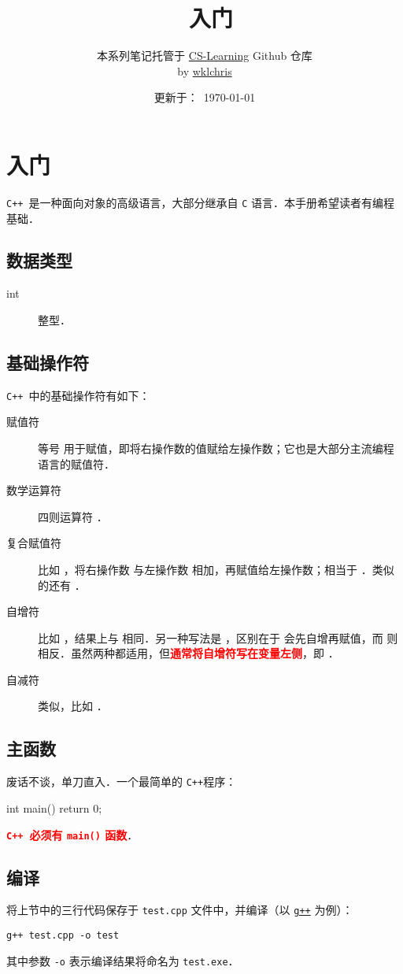 \documentclass[a4paper, zihao=-4, linespread=1]{ctexrep}
\title{\cpp\ 入门}
\author{
  本系列笔记托管于 \href{https://github.com/wklchris/CS-Learning}{CS-Learning} Github 仓库\\
  by \href{email:wklchris@hotmail.com}{wklchris}
}
\date{更新于：~\today}
\newcommand\cpp{\texttt{C++}}
\newcommand\hlt[1]{\textcolor{red}{\bfseries #1}}
\begin{document}
\maketitle

\chapter{入门}
\cpp\ 是一种面向对象的高级语言，大部分继承自 \texttt{C} 语言．本手册希望读者有编程基础．

\section{数据类型}
\begin{description}
\item[int] 整型．
\end{description}

\section{基础操作符}
\cpp\ 中的基础操作符有如下：
\begin{description}
\item[赋值符] 等号 \cppline{=} 用于赋值，即将右操作数的值赋给左操作数；它也是大部分主流编程语言的赋值符．
\item[数学运算符] 四则运算符 \cppline{+ - * /}．
\item[复合赋值符] 比如 ，将右操作数  与左操作数  相加，再赋值给左操作数；相当于 ．类似的还有 \cppline{-= *= /=}．
\item[自增符] 比如 ，结果上与  相同．另一种写法是 ，区别在于  会先自增再赋值，而  则相反．虽然两种都适用，但\hlt{通常将自增符写在变量左侧}，即 ．
\item[自减符] 类似，比如 ．
\end{description}

\section{主函数}
废话不谈，单刀直入．一个最简单的 \cpp 程序：
\begin{cpplang}
int main() {
    return 0;
}
\end{cpplang}
\hlt{\cpp\ 必须有 \texttt{main()} 函数}．

\section{编译}
将上节中的三行代码保存于 \texttt{test.cpp} 文件中，并编译（以 \href{http://www.mingw.org}{\texttt{g++}} 为例）：
\begin{lstlisting}
g++ test.cpp -o test
\end{lstlisting}
其中参数 \texttt{-o} 表示编译结果将命名为 \texttt{test.exe}．
\end{document}
